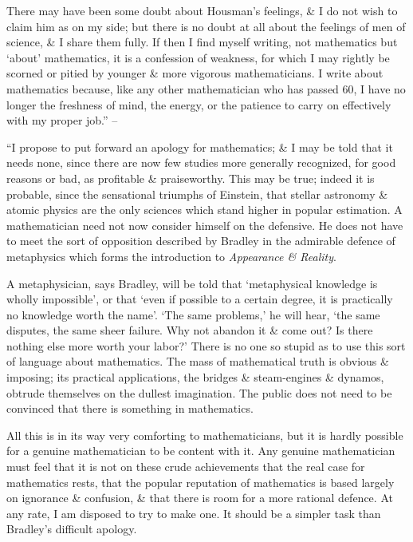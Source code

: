 \documentclass{article}
\numberwithin{equation}{section}
\begin{document}
There may have been some doubt about Housman's feelings, \& I do not wish to claim him as on my side; but there is no doubt at all about the feelings of men of science, \& I share them fully. If then I find myself writing, not mathematics but `about' mathematics, it is a confession of weakness, for which I may rightly be scorned or pitied by younger \& more vigorous mathematicians. I write about mathematics because, like any other mathematician who has passed 60, I have no longer the freshness of mind, the energy, or the patience to carry on effectively with my proper job.'' -- \cite[pp. 61--63]{Hardy1992}

 ``I propose to put forward an apology for mathematics; \& I may be told that it needs none, since there are now few studies more generally recognized, for good reasons or bad, as profitable \& praiseworthy. This may be true; indeed it is probable, since the sensational triumphs of Einstein, that stellar astronomy \& atomic physics are the only sciences which stand higher in popular estimation. A mathematician need not now consider himself on the defensive. He does not have to meet the sort of opposition described by Bradley in the admirable defence of metaphysics which forms the introduction to \textit{Appearance \& Reality}.

A metaphysician, says Bradley, will be told that `metaphysical knowledge is wholly impossible', or that `even if possible to a certain degree, it is practically no knowledge worth the name'. `The same problems,' he will hear, `the same disputes, the same sheer failure. Why not abandon it \& come out? Is there nothing else more worth your labor?' There is no one so stupid as to use this sort of language about mathematics. The mass of mathematical truth is obvious \& imposing; its practical applications, the bridges \& steam-engines \& dynamos, obtrude themselves on the dullest imagination. The public does not need to be convinced that there is something in mathematics.

All this is in its way very comforting to mathematicians, but it is hardly possible for a genuine mathematician to be content with it. Any genuine mathematician must feel that it is not on these crude achievements that the real case for mathematics rests, that the popular reputation of mathematics is based largely on ignorance \& confusion, \& that there is room for a more rational defence. At any rate, I am disposed to try to make one. It should be a simpler task than Bradley's difficult  apology.
\end{document}
